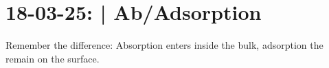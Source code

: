 \section{18-03-25: | Ab/Adsorption}

Remember the difference: Absorption enters inside the bulk, adsorption the remain on the surface.